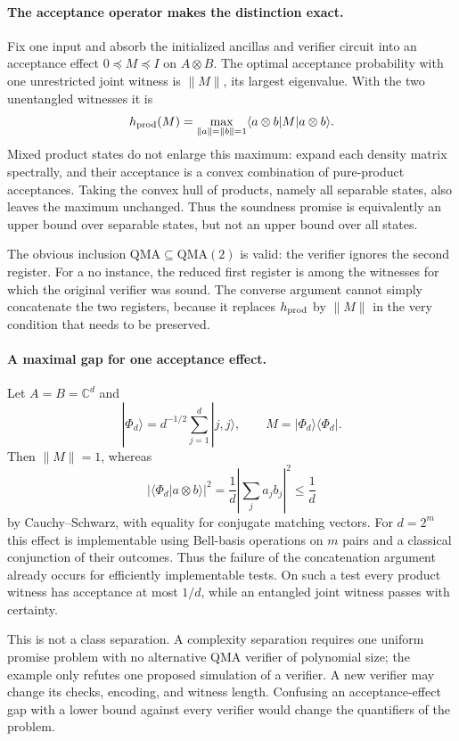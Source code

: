 \documentclass[11pt]{article}
\begin{document}
\paragraph{The acceptance operator makes the distinction exact.}
Fix one input and absorb the initialized ancillas and verifier circuit
into an acceptance effect $0\preceq M\preceq I$ on $A\otimes B$.
The optimal acceptance probability with one unrestricted joint witness
is $\|M\|$, its largest eigenvalue. With the two unentangled witnesses
it is
\[
 h_{\rm prod}(M)=\max_{\|a\|=\|b\|=1}
                   \langle a\otimes b|M|a\otimes b\rangle.
\]
Mixed product states do not enlarge this maximum: expand each density
matrix spectrally, and their acceptance is a convex combination of
pure-product acceptances. Taking the convex hull of products, namely
all separable states, also leaves the maximum unchanged. Thus the
soundness promise is equivalently an upper bound over separable states,
but not an upper bound over all states.

The obvious inclusion $\mathrm{QMA}\subseteq\mathrm{QMA}(2)$ is
valid: the verifier ignores the second register. For a no instance,
the reduced first register is among the witnesses for which the
original verifier was sound. The converse argument cannot simply
concatenate the two registers, because it replaces $h_{\rm prod}$
by $\|M\|$ in the very condition that needs to be preserved.

\paragraph{A maximal gap for one acceptance effect.}
Let $A=B=\mathbb C^d$ and
\[
 |\Phi_d\rangle=d^{-1/2}\sum_{j=1}^d|j,j\rangle,
 \qquad M=|\Phi_d\rangle\langle\Phi_d|.
\]
Then $\|M\|=1$, whereas
\[
 |\langle\Phi_d|a\otimes b\rangle|^2
 =\frac1d\left|\sum_j a_jb_j\right|^2\le\frac1d
\]
by Cauchy--Schwarz, with equality for conjugate matching vectors.
For $d=2^m$ this effect is implementable using Bell-basis operations
on $m$ pairs and a classical conjunction of their outcomes. Thus the
failure of the concatenation argument already occurs for efficiently
implementable tests. On such a test every product witness has
acceptance at most $1/d$, while an entangled joint witness passes
with certainty.

This is not a class separation. A complexity separation requires one
uniform promise problem with no alternative QMA verifier of polynomial
size; the example only refutes one proposed simulation of a verifier.
A new verifier may change its checks, encoding, and witness length.
Confusing an acceptance-effect gap with a lower bound against every
verifier would change the quantifiers of the problem.
\end{document}

